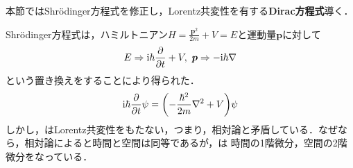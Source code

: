 \documentclass{report}
\begin{document}
本節ではShrödinger方程式を修正し，Lorentz共変性を有する\textbf{Dirac方程式}導く．

Shrödinger方程式は，ハミルトニアン$H=\frac{\bm{p}^2}{2m} + V=E$と運動量$\bm{p}$に対して
\begin{align}
  E \Rightarrow \mathrm{i}\hbar\frac{\partial}{\partial t} + V,\ \bm{p} \Rightarrow -\mathrm{i}\hbar \nabla 
\end{align}
という置き換えをすることにより得られた．
\begin{align}
  \mathrm{i}\hbar \frac{\partial}{\partial t}\psi = \qty(-\frac{\hbar^2}{2m}\nabla^2 + V)\psi   \label{TDSE}
\end{align}
しかし，はLorentz共変性をもたない，つまり，相対論と矛盾している．なぜなら，相対論によると時間と空間は同等であるが，は
時間の1階微分，空間の2階微分をなっている．
\end{document}
